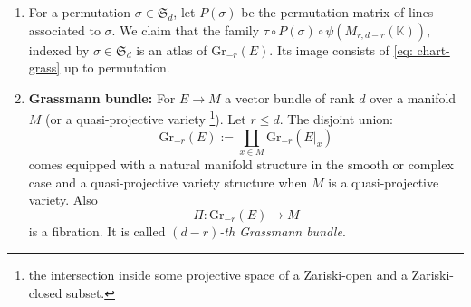 \documentclass[10pt]{article}
\theoremstyle{plain}
\theoremstyle{definition}
\theoremstyle{remark}
\begin{document}
\begin{enumerate}
\item[] For a permutation $\sigma\in \mathfrak S_d$, %
let $P(\sigma)$ be the  permutation matrix of lines associated to $\sigma$. We claim that the family $\tau\circ P(\sigma)\circ\psi(M_{r,d-r}(\mathbb{K}))%
$, indexed by $\sigma\in \mathfrak S_d$ is an atlas of $\mathrm{Gr}_{-r}(E)$. Its image consists of \eqref{eq: chart-grass} up to permutation. 

 
\item [2.]\textbf{Grassmann bundle:} For $E \to M$ a vector bundle of rank $d$ over a manifold $M$ (or a quasi-projective variety \footnote{the intersection inside some projective space of a Zariski-open and a Zariski-closed subset.}). Let $r\leq d$. The disjoint union:
  $$\mathrm{Gr}_{-r}({E}):= \coprod_{x\in M} \mathrm{Gr}_{-r}(E|_{x})  $$
  comes equipped with a natural manifold structure in the smooth or complex case and a quasi-projective variety structure when $M$ is a quasi-projective variety.  Also
 \begin{equation}\label{eq:Pi}
     \Pi\colon \mathrm{Gr}_{-r}(E)\longrightarrow M
 \end{equation}
 is a fibration. It is called \emph{$(d-r)$-th Grassmann bundle}. %
 

\end{enumerate}
\end{document}
